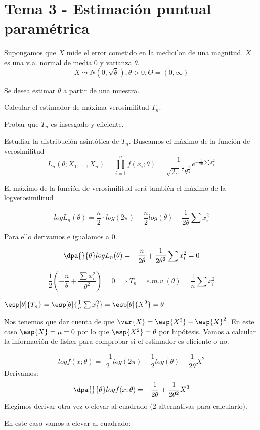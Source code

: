 \section{Tema 3 - Estimación puntual paramétrica}


\begin{problem}[2]
Supongamos que $X$ mide el error cometido en la medici'on de una magnitud. $X$ es una v.a. normal de media 0 y varianza $\theta$. 	
\[X\leadsto N(0,\sqrt{\theta}), \theta>0, \Theta = (0,\infty)\]

Se desea estimar $\theta$ a partir de una muestra.

\ppart Calcular el estimador de máxima verosimilitud $T_n$.

\ppart Probar que $T_n$ es insesgado y eficiente.

\ppart Estudiar la distribución asintótica de $T_n$.
\solution
\spart Buscamos el máximo de la función de verosimilitud
\[L_n(\theta;X_1,...,X_n) = \prod_{i=1}^n f(x_i;\theta) = \frac{1}{\sqrt{2\pi}^{\frac{n}{2}}\theta^{\frac{n}{2}}} e ^ {-\frac{1}{2\theta} \sum x_i^2}\]

El máximo de la función de verosimilitud será también el máximo de la logverosimilitud

\[logL_n(\theta) = \frac{n}{2}\cdot log(2\pi) - \frac{n}{2}log(\theta) - \frac{1}{2\theta} \sum x_i^2\]

Para ello derivamos e igualamos a 0.

\[\dpa{}{\theta} logL_n(\theta) = -\frac{n}{2\theta} + \frac{1}{2\theta^2}\sum x_i^2  = 0\]

\[\frac{1}{2}\left( - \frac{n}{\theta} + \frac{\sum x_i^2}{\theta^2}\right) = 0 \implies T_n = e.m.v.(\theta) = \frac{1}{n}\sum x_i^2\]


\spart $\esp[\theta]{T_n} = \esp[\theta]{\frac{1}{n}\sum x_i^2} = \esp[\theta]{X^2} = \theta$

Nos tenemos que dar cuenta de que $\var{X} = \esp{X^2} - \esp{X}^2$. En este caso $\esp{X} = \mu = 0$ por lo que $\esp{X^2} = \theta$ por hipótesis.
Vamos a calcular la información de fisher para comprobar si el estimador es eficiente o no.

\[ log f(x;\theta) = \frac{-1}{2}log(2\pi)-\frac{1}{2}log(\theta) - \frac{1}{2\theta}X^2\]
Derivamos:
\[\dpa{}{\theta} log f(x;\theta) = -\frac{1}{2\theta} + \frac{1}{2\theta^2}X^2\]
Elegimos derivar otra vez o elevar al cuadrado (2 alternativas para calcularlo).

En este caso vamos a elevar al cuadrado:


\end{problem}
